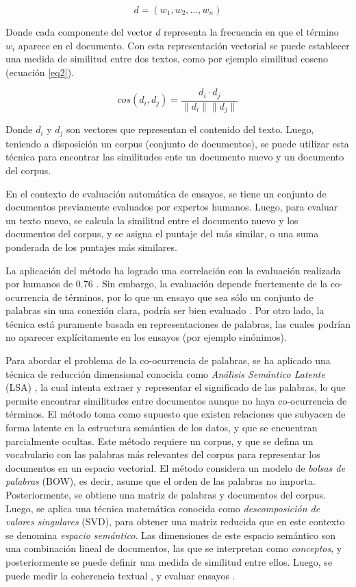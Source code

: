\documentclass[12pt]{diicc}
\begin{document}
\begin{equation}
	\label{eq1}
	d = (w_1, w_2, ..., w_n)
\end{equation}

Donde cada componente del vector $d$ representa la frecuencia en que el término $w_i$ aparece en el documento. Con esta representación vectorial se puede establecer una medida de similitud entre dos textos, como por ejemplo similitud coseno (ecuación \ref{eq2}).

\begin{equation}
	\label{eq2}
	cos(d_i, d_j) = \frac{d_i\cdot d_j}{\|d_i\| \|d_j\|}
\end{equation}

Donde $d_i$ y $d_j$ son vectores que representan el contenido del texto. Luego, teniendo a disposición un corpus (conjunto de documentos), se puede utilizar esta técnica para encontrar las similitudes ente un documento nuevo y un documento del corpus.

En el contexto de evaluación automática de ensayos, se tiene un conjunto de documentos previamente evaluados por expertos humanos. Luego, para evaluar un texto nuevo, se calcula la similitud entre el documento nuevo y los documentos del corpus, y se asigna el puntaje del más similar, o una suma ponderada de los puntajes más similares.

La aplicación del método ha logrado una correlación con la evaluación realizada por humanos de 0.76 \cite{t5}. Sin embargo, la evaluación depende fuertemente de la co-ocurrencia de términos, por lo que un ensayo que sea sólo un conjunto de palabras sin una conexión clara, podría ser bien evaluado \cite{t9}. Por otro lado, la técnica está puramente basada en representaciones de palabras, las cuales podrían no aparecer explícitamente en los ensayos (por ejemplo sinónimos).

Para abordar el problema de la co-ocurrencia de palabras, se ha aplicado una técnica de reducción dimensional conocida como {\em Análisis Semántico Latente} (LSA) \cite{t28}, la cual intenta extraer y representar el significado de las palabras, lo que permite encontrar similitudes entre documentos aunque no haya co-ocurrencia de términos. El método toma como supuesto que existen relaciones que subyacen de forma latente en la estructura semántica de los datos, y que se encuentran parcialmente ocultas. Este método requiere un corpus, y que se defina un vocabulario con las palabras más relevantes del corpus para representar los documentos en un espacio vectorial. El método considera un modelo de {\em bolsas de palabras} (BOW), es decir, asume que el orden de las palabras no importa. Posteriormente, se obtiene una matriz de palabras y documentos del corpus. Luego, se aplica una técnica matemática conocida como {\em descomposición de valores singulares} (SVD), para obtener una matriz reducida que en este contexto se denomina {\em espacio semántico}. Las dimensiones de este espacio semántico son una combinación lineal de documentos, las que se interpretan como {\em conceptos}, y posteriormente se puede definir una medida de similitud entre ellos. Luego, se puede medir la coherencia textual \cite{t8} \cite{t10} \cite{t20} \cite{t29}, y evaluar ensayos \cite{t9}. 
\end{document}
